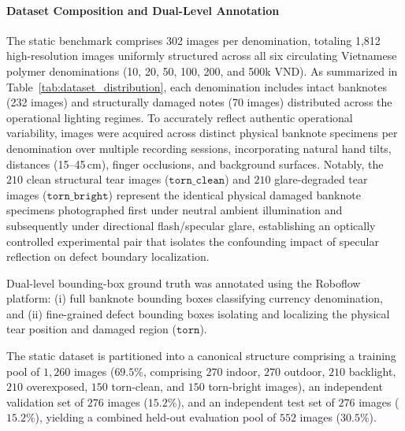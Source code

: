 \documentclass[final,5p,times,twocolumn,authoryear]{elsarticle}
\begin{document}
\paragraph{Dataset Composition and Dual-Level Annotation}
The static benchmark comprises 302 images per denomination, totaling 1,812 high-resolution images uniformly structured across all six circulating Vietnamese polymer denominations (10, 20, 50, 100, 200, and 500k VND). As summarized in Table~\ref{tab:dataset_distribution}, each denomination includes intact banknotes (232 images) and structurally damaged notes (70 images) distributed across the operational lighting regimes. To accurately reflect authentic operational variability, images were acquired across distinct physical banknote specimens per denomination over multiple recording sessions, incorporating natural hand tilts, distances (15--45\,cm), finger occlusions, and background surfaces. Notably, the $210$ clean structural tear images ($\texttt{torn\_clean}$) and $210$ glare-degraded tear images ($\texttt{torn\_bright}$) represent the identical physical damaged banknote specimens photographed first under neutral ambient illumination and subsequently under directional flash/specular glare, establishing an optically controlled experimental pair that isolates the confounding impact of specular reflection on defect boundary localization.

Dual-level bounding-box ground truth was annotated using the Roboflow platform: (i) full banknote bounding boxes classifying currency denomination, and (ii) fine-grained defect bounding boxes isolating and localizing the physical tear position and damaged region ($\texttt{torn}$).

The static dataset is partitioned into a canonical structure comprising a training pool of $1{,}260$ images ($69.5\%$, comprising $270$ indoor, $270$ outdoor, $210$ backlight, $210$ overexposed, $150$ torn-clean, and $150$ torn-bright images), an independent validation set of $276$ images ($15.2\%$), and an independent test set of $276$ images ($15.2\%$), yielding a combined held-out evaluation pool of $552$ images ($30.5\%$).
\end{document}
